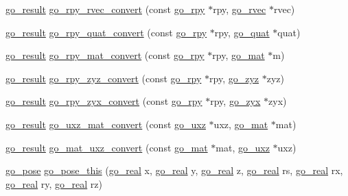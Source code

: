 \begin{DoxyCompactItemize}
\item 
\hyperlink{gotypes_8h_a55d48b38cd959f63c7e8db8337a9792a}{go\-\_\-result} \hyperlink{namespacegomotion_ac5ffecbde0428a84dbb839ed6d19600c}{go\-\_\-rpy\-\_\-rvec\-\_\-convert} (const \hyperlink{structgomotion_1_1go__rpy}{go\-\_\-rpy} $\ast$rpy, \hyperlink{structgomotion_1_1go__rvec}{go\-\_\-rvec} $\ast$rvec)
\item 
\hyperlink{gotypes_8h_a55d48b38cd959f63c7e8db8337a9792a}{go\-\_\-result} \hyperlink{namespacegomotion_a220f82039af859bfd9413107e7fbdf13}{go\-\_\-rpy\-\_\-quat\-\_\-convert} (const \hyperlink{structgomotion_1_1go__rpy}{go\-\_\-rpy} $\ast$rpy, \hyperlink{structgomotion_1_1go__quat}{go\-\_\-quat} $\ast$quat)
\item 
\hyperlink{gotypes_8h_a55d48b38cd959f63c7e8db8337a9792a}{go\-\_\-result} \hyperlink{namespacegomotion_a40757f3f8ff59d8879108d052ed087aa}{go\-\_\-rpy\-\_\-mat\-\_\-convert} (const \hyperlink{structgomotion_1_1go__rpy}{go\-\_\-rpy} $\ast$rpy, \hyperlink{structgomotion_1_1go__mat}{go\-\_\-mat} $\ast$m)
\item 
\hyperlink{gotypes_8h_a55d48b38cd959f63c7e8db8337a9792a}{go\-\_\-result} \hyperlink{namespacegomotion_ab5c106fe70eeb7dcf83243f83b08bb98}{go\-\_\-rpy\-\_\-zyz\-\_\-convert} (const \hyperlink{structgomotion_1_1go__rpy}{go\-\_\-rpy} $\ast$rpy, \hyperlink{structgomotion_1_1go__zyz}{go\-\_\-zyz} $\ast$zyz)
\item 
\hyperlink{gotypes_8h_a55d48b38cd959f63c7e8db8337a9792a}{go\-\_\-result} \hyperlink{namespacegomotion_abd91c890da5def1b8d92ecea36d35361}{go\-\_\-rpy\-\_\-zyx\-\_\-convert} (const \hyperlink{structgomotion_1_1go__rpy}{go\-\_\-rpy} $\ast$rpy, \hyperlink{structgomotion_1_1go__zyx}{go\-\_\-zyx} $\ast$zyx)
\item 
\hyperlink{gotypes_8h_a55d48b38cd959f63c7e8db8337a9792a}{go\-\_\-result} \hyperlink{namespacegomotion_a6d4f9130f4b766bf3e1c9023fe61c9ae}{go\-\_\-uxz\-\_\-mat\-\_\-convert} (const \hyperlink{structgomotion_1_1go__uxz}{go\-\_\-uxz} $\ast$uxz, \hyperlink{structgomotion_1_1go__mat}{go\-\_\-mat} $\ast$mat)
\item 
\hyperlink{gotypes_8h_a55d48b38cd959f63c7e8db8337a9792a}{go\-\_\-result} \hyperlink{namespacegomotion_ada32e9e6e533e94cc1dafaa88d584578}{go\-\_\-mat\-\_\-uxz\-\_\-convert} (const \hyperlink{structgomotion_1_1go__mat}{go\-\_\-mat} $\ast$mat, \hyperlink{structgomotion_1_1go__uxz}{go\-\_\-uxz} $\ast$uxz)
\item 
\hyperlink{structgomotion_1_1go__pose}{go\-\_\-pose} \hyperlink{namespacegomotion_a71730b5182346e2fe15337c358013fca}{go\-\_\-pose\-\_\-this} (\hyperlink{gotypes_8h_afd666a2393eebd71ee455846ac9def9b}{go\-\_\-real} x, \hyperlink{gotypes_8h_afd666a2393eebd71ee455846ac9def9b}{go\-\_\-real} y, \hyperlink{gotypes_8h_afd666a2393eebd71ee455846ac9def9b}{go\-\_\-real} z, \hyperlink{gotypes_8h_afd666a2393eebd71ee455846ac9def9b}{go\-\_\-real} rs, \hyperlink{gotypes_8h_afd666a2393eebd71ee455846ac9def9b}{go\-\_\-real} rx, \hyperlink{gotypes_8h_afd666a2393eebd71ee455846ac9def9b}{go\-\_\-real} ry, \hyperlink{gotypes_8h_afd666a2393eebd71ee455846ac9def9b}{go\-\_\-real} rz)

\end{DoxyCompactItemize}

